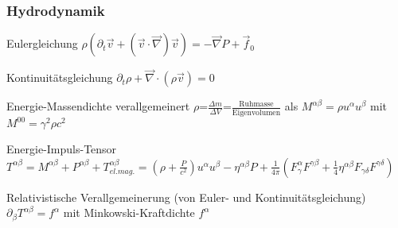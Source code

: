 \documentclass{beamer}
\begin{document}
\begin{frame}\frametitle{Hydrodynamik}

\tiny

\begin{block}{Eulergleichung}
$\rho \left(\partial_t\vec{v} + \left(\vec{v}\cdot\vec{\nabla}\right) \vec{v}\right) = -\vec{\nabla}P + \vec{f}_0$
\end{block}

\begin{block}{Kontinuitätsgleichung}
$\partial_t\rho + \vec{\nabla} \cdot (\rho \vec{v}) = 0$
\end{block}

\begin{block}{Energie-Massendichte}
verallgemeinert $\rho$=$\frac{\Delta m}{\Delta V}$=$\frac{\text{Ruhmasse}}{\text{Eigenvolumen}}$ \quad als \quad $M^{\alpha\beta} = \rho u^\alpha u^\beta$ \quad mit \quad $M^{00} = \gamma^2\rho c^2$
\end{block}

\begin{block}{Energie-Impuls-Tensor}
$T^{\alpha\beta} = M^{\alpha\beta} + P^{\alpha\beta} +  T^{\alpha\beta}_{el.mag.} = \left(\rho + \frac{P}{c^2}\right) u^\alpha u^\beta - \eta^{\alpha\beta}P + \frac{1}{4\pi} (F^\alpha_\gamma F^{\gamma\beta} + \frac{1}{4} \eta^{\alpha\beta} F_{\gamma\delta} F^{\gamma\delta})$
\end{block}

\begin{block}{Relativistische Verallgemeinerung (von Euler- und Kontinuitätsgleichung)}
$\partial_\beta T^{\alpha \beta} = f^\alpha$ mit Minkowski-Kraftdichte $f^\alpha$
\end{block}

\end{frame}
\end{document}
